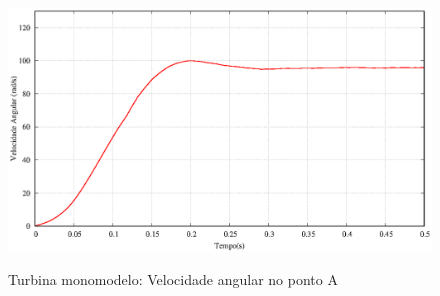\begin{figure}[!htbp]
	\caption{Turbina monomodelo: Velocidade angular no ponto A}
	\centering 
	\includegraphics[scale=0.6,trim=0cm 0cm 0cm 0cm, clip=true]{Imagens/Cap7/turbina_mono_velocidade_angular.eps}	
	\label{fig:turbina_mono_velAngA}
\end{figure}

